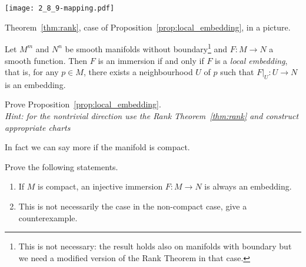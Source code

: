 \begin{marginfigure}
  \texttt{[image: 2\_8\_9-mapping.pdf]}
  \caption{Theorem~\ref{thm:rank}, case of Proposition~\ref{prop:local_embedding}, in a picture.}
\end{marginfigure}
\begin{proposition}\label{prop:local_embedding}
  Let $M^m$ and $N^n$ be smooth manifolds without boundary\footnote{This is not necessary: the result holds also on manifolds with boundary but we need a modified version of the Rank Theorem in that case.} and $F:M\to N$ a smooth function.
  Then $F$ is an immersion if and only if $F$ is a \emph{local embedding}, that is, for any $p\in M$, there exists a neighbourhood $U$ of $p$ such that $F\big|_U : U \to N$ is an embedding.
\end{proposition}
\begin{exercise}
  Prove Proposition~\ref{prop:local_embedding}. \\
  \textit{\small Hint: for the nontrivial direction use the Rank Theorem~\ref{thm:rank} and construct appropriate charts}
\end{exercise}

In fact we can say more if the manifold is compact.

\begin{exercise}
  Prove the following statements.
  \begin{enumerate}
    \item If $M$ is compact, an injective immersion $F:M\to N$ is always an embedding.
    \item This is not necessarily the case in the non-compact case, give a counterexample.
  \end{enumerate}
\end{exercise}

